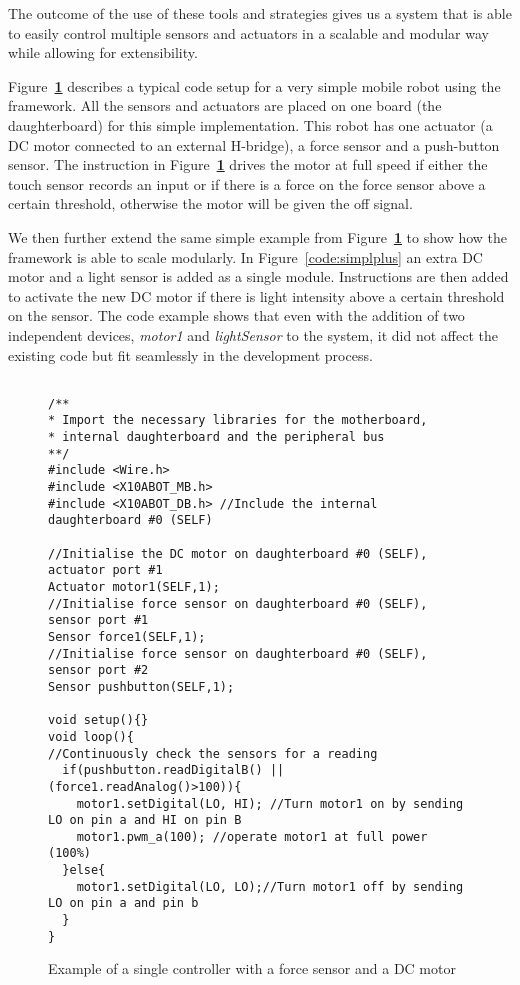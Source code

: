 The outcome of the use of these tools and strategies gives us a system that is able to easily control multiple sensors and actuators in a scalable and modular way while allowing for extensibility.

Figure~\textbf{\ref{code:simpl}} describes a typical code setup for a very simple mobile robot using the \xten framework. All the sensors and actuators are placed on one board (the daughterboard) for this simple implementation. This robot has one actuator (a DC motor connected to an external H-bridge), a force sensor and a push-button sensor. The instruction in Figure~\textbf{\ref{code:simpl}} drives the motor at full speed if either the touch sensor records an input or if there is a force on the force sensor above a certain threshold, otherwise the motor will be given the off signal.

 We then further extend the same simple example from Figure~\textbf{\ref{code:simpl}} to show how the \xten framework is able to scale modularly.
 In Figure~\ref{code:simplplus} an extra DC motor and a light sensor is added as a single module. Instructions are then added to activate the new DC motor if there is light intensity above a certain threshold on the sensor. The code example shows that even with the addition of two independent devices, \emph{motor1} and \emph{lightSensor} to the system, it did not affect the existing code but fit seamlessly in the development process.
 

\begin{figure}
		\footnotesize
    {\fontsize{8}{6}\selectfont
		\begin{verbatim}

/**
* Import the necessary libraries for the motherboard, 
* internal daughterboard and the peripheral bus
**/
#include <Wire.h>  
#include <X10ABOT_MB.h>
#include <X10ABOT_DB.h> //Include the internal daughterboard #0 (SELF)

//Initialise the DC motor on daughterboard #0 (SELF), actuator port #1
Actuator motor1(SELF,1);
//Initialise force sensor on daughterboard #0 (SELF), sensor port #1
Sensor force1(SELF,1);
//Initialise force sensor on daughterboard #0 (SELF), sensor port #2
Sensor pushbutton(SELF,1);

void setup(){}
void loop(){
//Continuously check the sensors for a reading
  if(pushbutton.readDigitalB() || (force1.readAnalog()>100)){
    motor1.setDigital(LO, HI); //Turn motor1 on by sending LO on pin a and HI on pin B
    motor1.pwm_a(100); //operate motor1 at full power (100%) 
  }else{
    motor1.setDigital(LO, LO);//Turn motor1 off by sending LO on pin a and pin b
  }
}	 
	\end{verbatim}
  }
  \caption{Example of a single controller with a force sensor and a DC motor} \label{code:simpl}
		
\end{figure}



